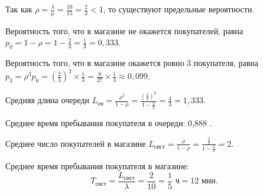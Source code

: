 \documentclass{article}
\begin{document}
Так как $\rho = \frac{\lambda}{\mu} = \frac{10}{15} = \frac{2}{3} < 1$, то существуют предельные вероятности.

Вероятность того, что в магазине не окажется покупателей, равна $p_0 = 1 - \rho = 1 - \frac{2}{3} = \frac{1}{3} = 0,333$.

Вероятность того, что в магазине окажется ровно 3 покупателя, равна $p_3 = \rho^3 p_0 = \left(\frac{2}{3}\right)^3 \times \frac{1}{3} = \frac{8}{27} \times \frac{1}{3} \approx 0,099$.

Средняя длина очереди $L_{\text{оч}} = \frac{\rho^2}{1 - \rho} = \frac{\left(\frac{2}{3}\right)^2}{1 - \frac{2}{3}} = \frac{4}{3} = 1,333$.

Среднее время пребывания покупателя в очереди: 
0,888 . 

Среднее число покупателей в магазине $L_{\text{сист}} = \frac{\rho}{1-\rho} = \frac{\frac{2}{3}}{1 - \frac{2}{3}} = 2$.

Среднее время пребывания покупателя в магазине: 
\[ T_{\text{сист}} = \frac{L_{\text{сист}}}{\lambda} = \frac{2}{10} = \frac{1}{5} \text{ ч} = 12 \text{ мин}. \]
\end{document}
